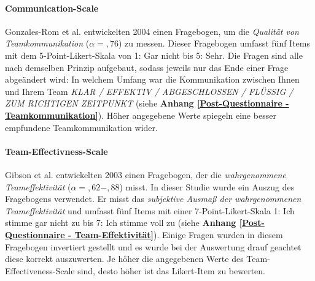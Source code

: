 \documentclass[a4paper,11pt]{article}%
\renewcommand{\\}{\vspace*{0.5\baselineskip} \newline}
\begin{document}
		\paragraph{Communication-Scale}
Gonzales-Rom et al. \citep[S. 1049]{gonzalez2014climate} entwickelten 2004 einen Fragebogen, um die \textit{Qualität von Teamkommunikation} ($\alpha =,76$) zu messen. Dieser Fragebogen umfasst fünf Items mit dem 5-Point-Likert-Skala von 1: \glqq{}Gar nicht\dq{} bis 5: \glqq{}Sehr\dq{}. Die Fragen sind alle nach demselben Prinzip aufgebaut, sodass jeweils nur das Ende einer Frage abgeändert wird: \glqq{}In welchem Umfang war die Kommunikation zwischen Ihnen und Ihrem Team \textit{KLAR / EFFEKTIV / ABGESCHLOSSEN / FLÜSSIG / ZUM RICHTIGEN ZEITPUNKT\dq{}} (siehe \textbf{Anhang \ref{Post-Questionnaire - Teamkommunikation}}). Höher angegebene Werte spiegeln eine besser empfundene Teamkommunikation wider.

		\paragraph{Team-Effectivness-Scale}
Gibson et al. \citep[S. 469]{gibson2003team} entwickelten 2003 einen Fragebogen, der die \textit{wahrgenommene Teameffektivität} ($\alpha =,62-,88$) misst. In dieser Studie wurde ein Auszug des Fragebogens verwendet. Er misst das \textit{subjektive Ausmaß der wahrgenommenen Teameffektivität} und umfasst fünf Items mit einer 7-Point-Likert-Skala 1: \glqq{}Ich stimme gar nicht zu\dq{} bis 7: \glqq{}Ich stimme voll zu\dq{} (siehe \textbf{Anhang \ref{Post-Questionnaire - Team-Effektivität}}). Einige Fragen wurden in diesem Fragebogen invertiert gestellt und es wurde bei der Auswertung drauf geachtet diese korrekt auszuwerten. Je höher die angegebenen Werte des Team-Effectiveness-Scale sind, desto höher ist das Likert-Item zu bewerten.

\end{document}
